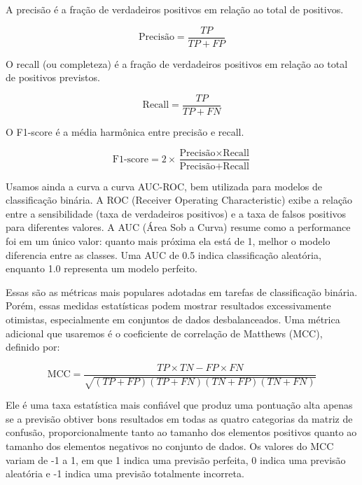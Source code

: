 A precisão é a fração de verdadeiros positivos em relação ao total de positivos. 

\begin{equation}
    \text{Precisão} = \frac{TP}{TP + FP}
\end{equation}

O recall (ou completeza) é a fração de verdadeiros positivos em relação ao total de positivos previstos.

\begin{equation}
    \text{Recall} = \frac{TP}{TP + FN}
\end{equation}

O F1-score é a média harmônica entre precisão e recall.

\begin{equation}
    \text{F1-score} = 2 \times \frac{\text{Precisão} \times \text{Recall}}{\text{Precisão} + \text{Recall}}
\end{equation}

Usamos ainda a curva a curva AUC-ROC, bem utilizada para modelos de classificação binária. A ROC (Receiver Operating Characteristic) exibe a relação entre a sensibilidade (taxa de verdadeiros positivos) e a taxa de falsos positivos para diferentes valores. A AUC (Área Sob a Curva) resume como a performance foi em um único valor: quanto mais próxima ela está de 1, melhor o modelo diferencia entre as classes. Uma AUC de 0.5 indica classificação aleatória, enquanto 1.0 representa um modelo perfeito.

\vspace{\baselineskip}

Essas são as métricas mais populares adotadas em tarefas de classificação binária. Porém, essas medidas estatísticas podem mostrar resultados excessivamente otimistas, especialmente em conjuntos de dados desbalanceados. Uma métrica adicional que usaremos é o coeficiente de correlação de Matthews (MCC), definido por:

\begin{equation}
    \text{MCC} = \frac{TP \times TN - FP \times FN}{\sqrt{(TP + FP)(TP + FN)(TN + FP)(TN + FN)}}
\end{equation}

Ele é uma taxa estatística mais confiável que produz uma pontuação alta apenas se a previsão obtiver bons resultados em todas as quatro categorias da matriz de confusão, proporcionalmente tanto ao tamanho dos elementos positivos quanto ao tamanho dos elementos negativos no conjunto de dados. Os valores do MCC variam de -1 a 1, em que 1 indica uma previsão perfeita, 0 indica uma previsão aleatória e -1 indica uma previsão totalmente incorreta.


